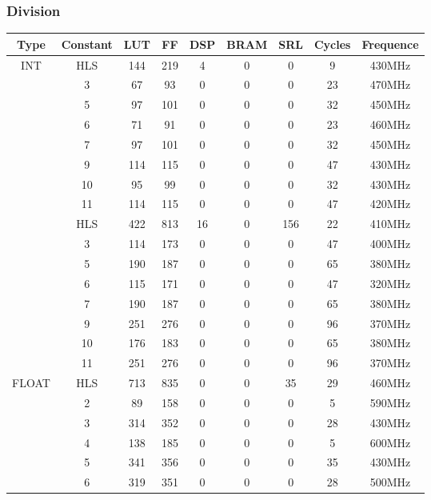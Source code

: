 \documentclass[10pt,a4paper,twoside]{article}
\begin{document}
\subsubsection{Division}
\begin{tabular}{|c|c|c|c|c|c|c|c|c|}
	\hline
	Type & Constant & LUT & FF & DSP & BRAM & SRL & Cycles & Frequence \\
	\hline
	\hline
	\multirow{9}{*}{INT} & HLS & 144 & 219 & 4 & 0 & 0 & 9 & 430MHz \\
	\cline{2-9}
	& 3 & 67 & 93 & 0 & 0 & 0 & 23 & 470MHz \\
	\cline{2-9}
	& 5 & 97 & 101 & 0 & 0 & 0 & 32 & 450MHz  \\
	\cline{2-9}
	& 6 & 71 & 91 & 0 & 0 & 0 & 23 & 460MHz \\
	\cline{2-9}
	& 7 & 97 & 101 & 0 & 0 & 0 & 32 & 450MHz \\
	\cline{2-9}
	& 9 & 114 & 115 & 0 & 0 & 0 & 47 & 430MHz \\
	\cline{2-9}
	& 10 & 95 & 99 & 0 & 0 & 0 & 32 & 430MHz\\
	\cline{2-9}
	& 11 & 114 & 115 & 0 & 0 & 0 & 47 & 420MHz \\
	\hline
	\hline
	\multirow{9}{*}{LONG} & HLS & 422 & 813 & 16 & 0 & 156 & 22 & 410MHz \\
	\cline{2-9}
	& 3 & 114 & 173 & 0 & 0 & 0 & 47 & 400MHz \\
	\cline{2-9}
	& 5 & 190 & 187 & 0 & 0 & 0 & 65 & 380MHz\\
	\cline{2-9}
	& 6 & 115 & 171 & 0 & 0 & 0 & 47 & 320MHz\\
	\cline{2-9}
	& 7 & 190 & 187 & 0 & 0 & 0 & 65 & 380MHz\\
	\cline{2-9}
	& 9 & 251 & 276 & 0 & 0 & 0 & 96 & 370MHz\\
	\cline{2-9}
	& 10 & 176 & 183 & 0 & 0 & 0 & 65 & 380MHz\\
	\cline{2-9}
	& 11 & 251 & 276 & 0 & 0 & 0 & 96 & 370MHz\\
	\hline
	\hline
	\multirow{11}{*}{FLOAT} & HLS & 713 & 835 & 0 & 0 & 35 & 29 & 460MHz \\
	\cline{2-9}
	& 2 & 89 & 158 & 0 & 0 & 0 & 5 & 590MHz \\
	\cline{2-9}
	& 3 & 314 & 352 & 0 & 0 & 0 & 28 & 430MHz \\
	\cline{2-9}
	& 4 & 138 & 185 & 0 & 0 & 0 & 5 & 600MHz\\
	\cline{2-9}
	& 5 & 341 & 356 & 0 & 0 & 0 & 35 & 430MHz\\
	\cline{2-9}
	& 6 & 319 & 351 & 0 & 0 & 0 & 28 & 500MHz\\

\end{tabular}
\end{document}
